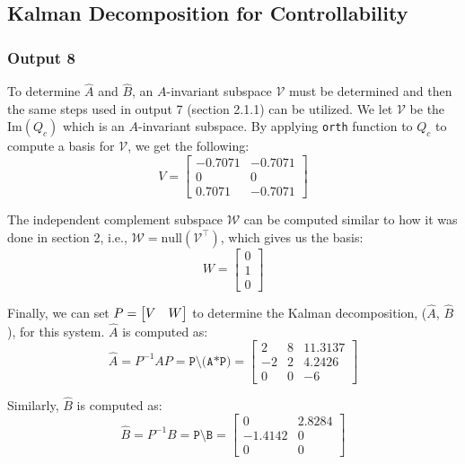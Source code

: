 \documentclass[10pt]{article}
\begin{document}
\subsection{Kalman Decomposition for Controllability}
\subsubsection{Output 8}
To determine $\hat{A}$ and $\hat{B}$, an $A$-invariant subspace $\mathcal{V}$ must be determined and then the same steps used in output 7 (section 2.1.1) can be utilized. We let $\mathcal{V}$ be the $\text{Im}(Q_c)$ which is an $A$-invariant subspace. By applying \texttt{orth} function to $Q_c$ to compute a basis for $\mathcal{V}$, we get the following:
\begin{equation*}
    V = \begin{bmatrix}
        -0.7071 & -0.7071 \\
        0 & 0 \\ 
        0.7071 & -0.7071
    \end{bmatrix}
\end{equation*}

The independent complement subspace $\mathcal{W}$ can be computed similar to how it was done in section 2, i.e., $\mathcal{W} = \text{null}(\mathcal{V}^\intercal)$, which gives us the basis:
\begin{equation*}
    W = 
        \begin{bmatrix}
            0\\1\\0
        \end{bmatrix}
\end{equation*}

Finally, we can set $P = \begin{bmatrix} V & W \end{bmatrix}$ to determine the Kalman decomposition, ($\hat{A}$, $\hat{B}$), for this system. $\hat{A}$ is computed as:
\begin{equation*}
    \hat{A} = P^{-1}AP = \texttt{P\textbackslash(A*P)} = 
    \begin{bmatrix}
        2 & 8 & 11.3137 \\
        -2 & 2 & 4.2426 \\ 
        0 & 0 & -6
    \end{bmatrix}
\end{equation*}

Similarly, $\hat{B}$ is computed as:
\begin{equation*}
    \hat{B} = P^{-1}B = \texttt{P\textbackslash B} = 
    \begin{bmatrix}
        0 & 2.8284 \\
        -1.4142 & 0 \\ 
        0 & 0 
    \end{bmatrix}
\end{equation*}
\end{document}
